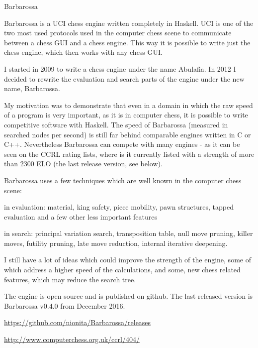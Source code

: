 \begin{hcarentry}{Barbarossa}
\makeheader

Barbarossa is a UCI chess engine written completely in Haskell. UCI is one of
the two most used protocols used in the computer chess scene to communicate
between a chess GUI and a chess engine. This way it is possible to write just
the chess engine, which then works with any chess GUI.

I started in 2009 to write a chess engine under the name Abulafia. In 2012 I
decided to rewrite the evaluation and search parts of the engine under the new
name, Barbarossa.

My motivation was to demonstrate that even in a domain in which the raw speed
of a program is very important, as it is in computer chess, it is possible to
write competitive software with Haskell. The speed of Barbarossa (measured in
searched nodes per second) is still far behind comparable engines written in C
or C++. Nevertheless Barbarossa can compete with many engines - as it can be
seen on the CCRL rating lists, where is it currently listed with a strength
of more than 2300 ELO (the last release version, see below).

Barbarossa uses a few techniques which are well known in the computer chess
scene:

\begin{compactitem}
\item in evaluation: material, king safety, piece mobility, pawn structures,
  tapped evaluation and a few other less important features
\item in search: principal variation search, transposition table, null move
  pruning, killer moves, futility pruning, late move reduction, internal
  iterative deepening.
\end{compactitem}

I still have a lot of ideas which could improve the strength of the engine,
some of which address a higher speed of the calculations, and some, new
chess related features, which may reduce the search tree.

The engine is open source and is published on github. The last released
version is Barbarossa v0.4.0 from December 2016.

\FurtherReading
\begin{compactitem}
\item\url{https://github.com/nionita/Barbarossa/releases}
\item\url{http://www.computerchess.org.uk/ccrl/404/}
\end{compactitem}
\end{hcarentry}
